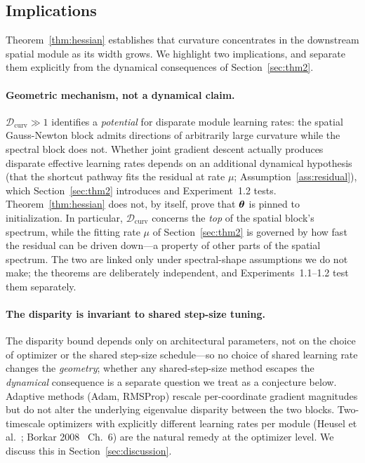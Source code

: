 \subsection{Implications}

Theorem~\ref{thm:hessian} establishes that curvature concentrates in
the downstream spatial module as its width grows. We highlight two
implications, and separate them explicitly from the dynamical
consequences of Section~\ref{sec:thm2}.

\paragraph{Geometric mechanism, not a dynamical claim.}
$\mathcal{D}_{\mathrm{curv}} \gg 1$ identifies a
\emph{potential} for disparate module learning rates: the spatial
Gauss-Newton block admits directions of arbitrarily large curvature
while the spectral block does not. Whether joint gradient descent
actually produces disparate effective learning rates depends on an
additional dynamical hypothesis (that the shortcut pathway fits the
residual at rate $\mu$; Assumption~\ref{ass:residual}), which
Section~\ref{sec:thm2} introduces and Experiment~1.2 tests.
Theorem~\ref{thm:hessian} does not,
by itself, prove that ${\boldsymbol{\theta}}$ is pinned to initialization.
In particular, $\mathcal{D}_{\mathrm{curv}}$ concerns the \emph{top}
of the spatial block's spectrum, while the fitting rate $\mu$ of
Section~\ref{sec:thm2} is governed by how fast the residual can be
driven down---a property of other parts of the spatial spectrum. The
two are linked only under spectral-shape assumptions we do not make;
the theorems are deliberately independent, and
Experiments~1.1--1.2 test them separately.

\paragraph{The disparity is invariant to shared step-size tuning.}
The disparity bound depends only on architectural parameters, not on
the choice of optimizer or the shared step-size schedule---so no
choice of shared learning rate changes the \emph{geometry}; whether
any shared-step-size method escapes the \emph{dynamical} consequence
is a separate question we treat as a conjecture below. Adaptive
methods (Adam, RMSProp) rescale per-coordinate gradient magnitudes
but do not alter the underlying eigenvalue disparity between the two
blocks. Two-timescale optimizers with explicitly different learning
rates per module (Heusel et al.~\cite{heusel2017gans}; Borkar
2008~\cite{borkar2008stochastic} Ch.~6) are the natural remedy at the
optimizer level. We discuss this in Section~\ref{sec:discussion}.

